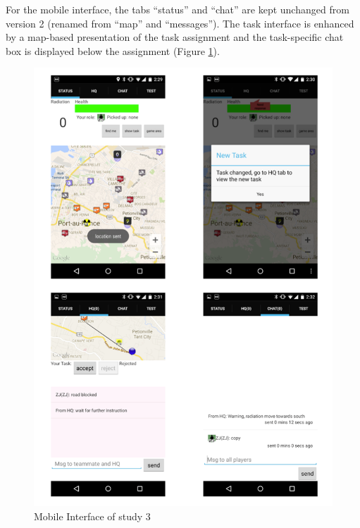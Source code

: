 For the mobile interface, the tabs ``status'' and ``chat'' are kept unchanged from version 2 (renamed from ``map'' and ``messages''). The task interface is enhanced by a map-based presentation of the task assignment and the task-specific chat box is displayed below the assignment (Figure \ref{fig:study3interfacemobile}).

\begin{figure}[H]
  \centering
  \includegraphics[width=1\textwidth]{img/conclusion/study3interfaceMobile}
  \caption{Mobile Interface of study 3}
  \label{fig:study3interfacemobile}
\end{figure}


